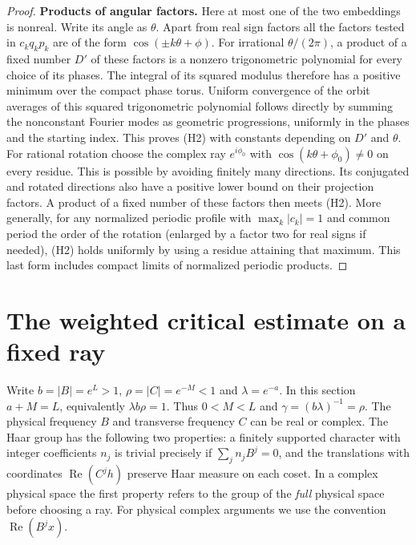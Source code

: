 \documentclass[11pt,a4paper]{article}
\begin{document}
\begin{proof}
\par\smallskip\noindent\textbf{Products of angular factors.}\enspace
Here at most one of the two embeddings is nonreal. Write its angle as
$\theta$. Apart from real sign factors all the factors tested in
$c_k q_k p_k$ are of the form $\cos(\pm k\theta+\phi)$.
For irrational $\theta/(2\pi)$, a product of a fixed number $D'$ of
these factors is a nonzero trigonometric polynomial for every choice
of its phases. The integral of its squared modulus therefore has a
positive minimum over the compact phase torus. Uniform convergence of
the orbit averages of this squared trigonometric polynomial follows
directly by summing the nonconstant Fourier modes as geometric
progressions, uniformly in the phases and the starting index.
This proves (H2) with constants depending on $D'$ and $\theta$.
For rational rotation choose the complex ray $e^{i\phi_0}$ with
$\cos(k\theta+\phi_0)\ne0$ on every residue. This is possible by
avoiding finitely many directions. Its conjugated and rotated
directions also have a positive lower bound on their projection
factors. A product of a fixed number of these factors then meets
(H2). More generally, for any normalized periodic profile with
$\max_k|c_k|=1$ and common period the order of the rotation
(enlarged by a factor two for real signs if needed), (H2) holds
uniformly by using a residue attaining that maximum. This last
form includes compact limits of normalized periodic products.
\end{proof}
\section{The weighted critical estimate on a fixed ray}
\label{sec:weighted-critical-ray}
Write $b=|B|=e^L>1$, $\rho=|C|=e^{-M}<1$ and
$\lambda=e^{-a}$. In this section $a+M=L$, equivalently
$\lambda b\rho=1$. Thus $0<M<L$ and $\gamma=(b\lambda)^{-1}=\rho$.
The physical frequency $B$ and transverse frequency $C$ can be real or
complex. The Haar group has the following two properties: a finitely
supported character with integer coefficients $n_j$ is trivial precisely
if $\sum_j n_j B^j=0$, and the translations with coordinates
$\operatorname{Re}(C^j h)$ preserve Haar measure on each coset. In a
complex physical space the first property refers to the group of the
\emph{full} physical space before choosing a ray. For physical complex
arguments we use the convention $\operatorname{Re}(B^j x)$.
\end{document}
